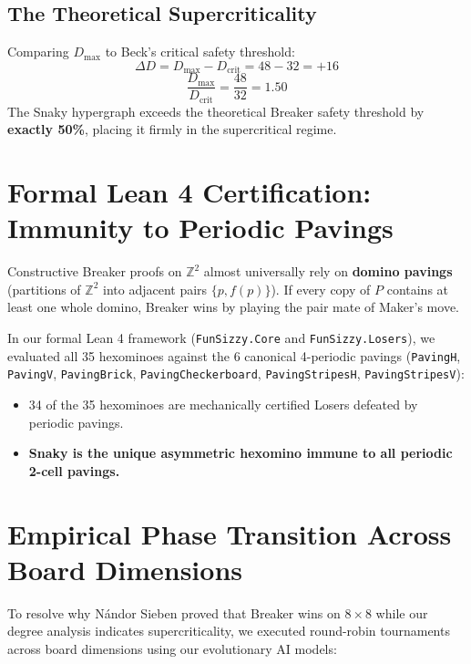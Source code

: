 \documentclass[11pt,a4paper]{article}
\begin{document}
\subsection{The Theoretical Supercriticality}
Comparing $D_{\max}$ to Beck's critical safety threshold:
\[ \Delta D = D_{\max} - D_{\text{crit}} = 48 - 32 = +16 \]
\[ \frac{D_{\max}}{D_{\text{crit}}} = \frac{48}{32} = 1.50 \]
The Snaky hypergraph exceeds the theoretical Breaker safety threshold by \textbf{exactly 50\%}, placing it firmly in the supercritical regime.

\section{Formal Lean 4 Certification: Immunity to Periodic Pavings}

Constructive Breaker proofs on $\mathbb{Z}^2$ almost universally rely on \textbf{domino pavings} (partitions of $\mathbb{Z}^2$ into adjacent pairs $\{p, f(p)\}$). If every copy of $P$ contains at least one whole domino, Breaker wins by playing the pair mate of Maker's move.

In our formal Lean 4 framework (\texttt{FunSizzy.Core} and \texttt{FunSizzy.Losers}), we evaluated all 35 hexominoes against the 6 canonical 4-periodic pavings (\texttt{PavingH}, \texttt{PavingV}, \texttt{PavingBrick}, \texttt{PavingCheckerboard}, \texttt{PavingStripesH}, \texttt{PavingStripesV}):
\begin{itemize}
    \item 34 of the 35 hexominoes are mechanically certified Losers defeated by periodic pavings.
    \item \textbf{Snaky is the unique asymmetric hexomino immune to all periodic 2-cell pavings.}
\end{itemize}

\section{Empirical Phase Transition Across Board Dimensions}

To resolve why N\'andor Sieben \cite{sieben2008} proved that Breaker wins on $8 \times 8$ while our degree analysis indicates supercriticality, we executed round-robin tournaments across board dimensions using our evolutionary AI models:
\end{document}
